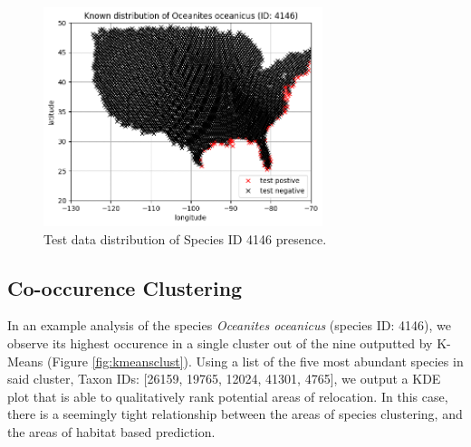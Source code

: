 \documentclass{article}
\begin{document}
\begin{figure}[H]
    \begin{minipage}{0.3\textwidth}
        \includegraphics[width=\textwidth]{figures/test_species.png}
        \caption{Test data distribution of Species ID 4146 presence.}
        \label{fig:pred3}
    \end{minipage}\hfill
\end{figure}

\subsection{Co-occurence Clustering}
In an example analysis of the species \textit{Oceanites oceanicus} (species ID: 4146), we observe its highest occurence in a single cluster out of the nine outputted by K-Means (Figure \ref{fig:kmeansclust}). Using a list of the five most abundant species in said cluster, Taxon IDs: [26159, 19765, 12024, 41301, 4765], we output a KDE plot that is able to qualitatively rank potential areas of relocation. In this case, there is a seemingly tight relationship between the areas of species clustering, and the areas of habitat based prediction.
\end{document}
